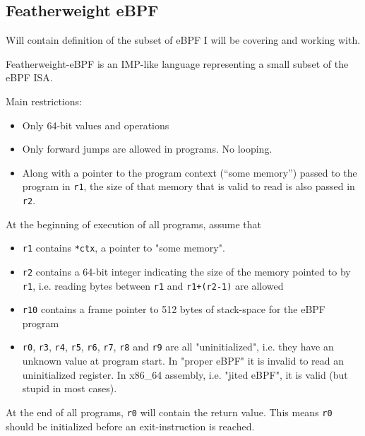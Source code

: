 \subsection{Featherweight eBPF}
\label{subsec:featherweight_ebpf}
Will contain definition of the subset of eBPF I will be covering and working with.


Featherweight-eBPF is an IMP-like language representing a small subset of the eBPF ISA.

Main restrictions:
\begin{itemize}
\item Only 64-bit values and operations
  \item Only forward jumps are allowed in programs. No looping.
\item Along with a pointer to the program context (``some memory'') passed to the program in \texttt{r1}, the size of that memory that is valid to read is also passed in \texttt{r2}. 
\end{itemize}


At the beginning of execution of all programs, assume that
\begin{itemize}
\item \texttt{r1} contains \texttt{*ctx}, a pointer to "some memory".
\item \texttt{r2} contains a 64-bit integer indicating the size of the memory pointed to by \texttt{r1}, i.e. reading bytes between \texttt{r1} and \texttt{r1+(r2-1)} are allowed
\item \texttt{r10} contains a frame pointer to 512 bytes of stack-space for the eBPF program
\item \texttt{r0}, \texttt{r3}, \texttt{r4}, \texttt{r5}, \texttt{r6}, \texttt{r7}, \texttt{r8} and \texttt{r9} are all "uninitialized", i.e. they have an unknown value at program start. In "proper eBPF" it is invalid to read an uninitialized register. In x86\_64 assembly, i.e. "jited eBPF", it is valid (but stupid in most cases).

\end{itemize}

At the end of all programs, \texttt{r0} will contain the return value. 
This means \texttt{r0} should be initialized before an exit-instruction is reached.


